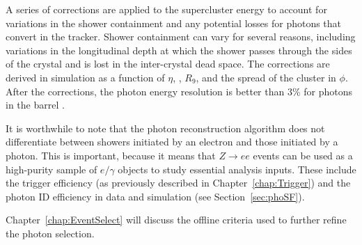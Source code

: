 A series of corrections are applied to the supercluster energy to account for variations in the shower containment and any potential losses for photons that convert in the tracker. Shower containment can vary for several reasons, including variations in the longitudinal depth at which the shower passes through the sides of the crystal and is lost in the inter-crystal dead space. The corrections are derived in simulation as a function of $\eta$, \ET, $R_9$, and the spread of the cluster in $\phi$. After the corrections, the photon energy resolution is better than 3\% for photons in the barrel \cite{phoPerf8TeV}.

It is worthwhile to note that the photon reconstruction algorithm does not differentiate between showers initiated by an electron and those initiated by a photon. This is important, because it means that $Z \rightarrow ee$ events can be used as a high-purity sample of $e/\gamma$ objects to study essential analysis inputs. These include the trigger efficiency (as previously described in Chapter~\ref{chap:Trigger}) and the photon ID efficiency in data and simulation (see Section~\ref{sec:phoSF}). 

Chapter~\ref{chap:EventSelect} will discuss the offline criteria used to further refine the photon selection.

